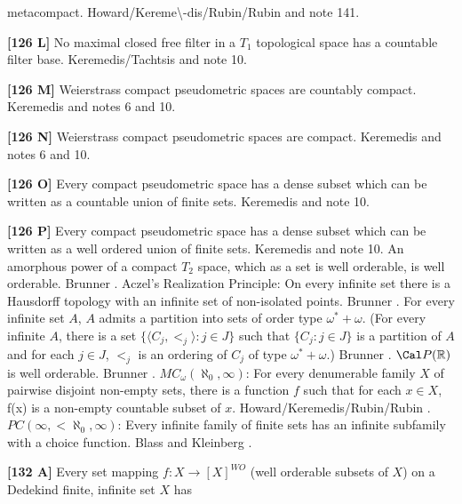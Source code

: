 metacompact. \ac{Howard/Kereme\-dis/Rubin/Rubin} \cite{1997b} and
note 141.
\smallskip
\item{}{\bf [126 L]} No maximal closed free filter in a $T_1$
topological space has a countable filter base. \ac{Keremedis/Tachtsis}
\cite{1999b} and note 10.
\smallskip
\item{}{\bf [126 M]} Weierstrass compact pseudometric spaces are
countably compact.  \ac{Keremedis} \cite{1999a} and notes 6 and
10.
\smallskip
\item{}{\bf [126 N]} Weierstrass compact pseudometric spaces are
compact.  \ac{Keremedis} \cite{1999a} and notes 6 and 10.
\smallskip
\item{}{\bf [126 O]} Every compact pseudometric space has a dense
subset which can be written as a countable union of finite sets.
\ac{Keremedis} \cite{1999a} and note 10.
\smallskip
\item{}{\bf [126 P]} Every compact pseudometric space has a dense
subset which can be written as a well ordered union of finite
sets.  \ac{Keremedis} \cite{1999a} and note 10.
\medskip
{} An amorphous power of a compact $T_2$ space, which
as a set is well orderable, is well orderable.  \ac{Brunner} \cite{1984b}.
\medskip
{} Aczel's Realization Principle: On every infinite
set there is a Hausdorff topology with an infinite set of non-isolated
points.  \ac{Brunner} \cite{1984f}. 
\medskip
{} For every infinite set $A$, $A$ admits a partition
into sets of order type $\omega^{*} + \omega$. (For every infinite $A$,
there is a set $\{\langle C_j,<_j \rangle: j\in J\}$ such that
$\{C_j: j\in J\}$ is a partition of $A$ and for each $j\in J$, $<_j$
is an ordering of $C_j$ of type $\omega^* + \omega$.)  \ac{Brunner}
\cite{1984f}.
\medskip
{} ${\Cal P}(\Bbb R)$ is well orderable. \ac{Brunner}
\cite{1984f}.
\medskip
{} $MC_\omega(\aleph_0,\infty)$: For every
denumerable family $X$ of pairwise disjoint non-empty sets, there is a
function $f$ such that for each $x\in X$, f(x) is a non-empty countable
subset of $x$. \ac{Howard/Keremedis/Rubin/Rubin} \cite{1998b}.
\medskip
{} $PC(\infty, <\aleph_0,\infty)$:  Every infinite
family of finite  sets has an infinite subfamily with a choice
function.  \ac{Blass} \cite{1977a} and \ac{Kleinberg} \cite{1969}.
\smallskip
\item{}{\bf [132 A]}  Every set mapping $f: X\rightarrow [X]^{WO}$ (well
orderable subsets of $X$) on a Dedekind finite, infinite set $X$ has
